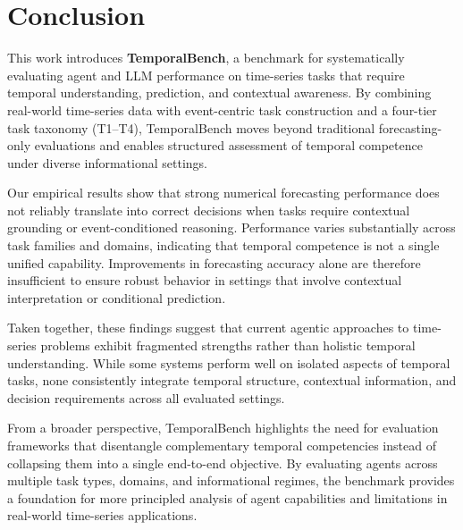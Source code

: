 \section{Conclusion}

This work introduces \textbf{TemporalBench}, a benchmark for systematically evaluating agent and LLM performance on time-series tasks that require temporal understanding, prediction, and contextual awareness.
By combining real-world time-series data with event-centric task construction and a four-tier task taxonomy (T1--T4), TemporalBench moves beyond traditional forecasting-only evaluations and enables structured assessment of temporal competence under diverse informational settings.

Our empirical results show that strong numerical forecasting performance does not reliably translate into correct decisions when tasks require contextual grounding or event-conditioned reasoning.
Performance varies substantially across task families and domains, indicating that temporal competence is not a single unified capability.
Improvements in forecasting accuracy alone are therefore insufficient to ensure robust behavior in settings that involve contextual interpretation or conditional prediction.

Taken together, these findings suggest that current agentic approaches to time-series problems exhibit fragmented strengths rather than holistic temporal understanding.
While some systems perform well on isolated aspects of temporal tasks, none consistently integrate temporal structure, contextual information, and decision requirements across all evaluated settings.

From a broader perspective, TemporalBench highlights the need for evaluation frameworks that disentangle complementary temporal competencies instead of collapsing them into a single end-to-end objective.
By evaluating agents across multiple task types, domains, and informational regimes, the benchmark provides a foundation for more principled analysis of agent capabilities and limitations in real-world time-series applications.

